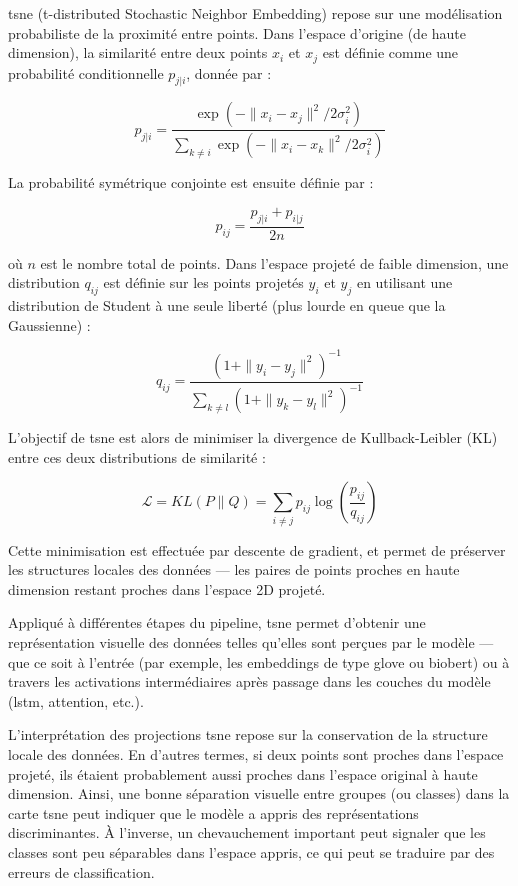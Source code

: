 \documentclass[12pt]{report}
\begin{document}
\gls{tsne} (t-distributed Stochastic Neighbor Embedding) repose sur une modélisation probabiliste de la proximité entre points. Dans l’espace d’origine (de haute dimension), la similarité entre deux points $x_i$ et $x_j$ est définie comme une probabilité conditionnelle $p_{j|i}$, donnée par :

\begin{equation}
p_{j|i} = \frac{\exp(-\|x_i - x_j\|^2 / 2\sigma_i^2)}{\sum_{k \neq i} \exp(-\|x_i - x_k\|^2 / 2\sigma_i^2)}
\end{equation}

La probabilité symétrique conjointe est ensuite définie par :

\begin{equation}
p_{ij} = \frac{p_{j|i} + p_{i|j}}{2n}
\end{equation}

où $n$ est le nombre total de points. Dans l’espace projeté de faible dimension, une distribution $q_{ij}$ est définie sur les points projetés $y_i$ et $y_j$ en utilisant une distribution de Student à une seule liberté (plus lourde en queue que la Gaussienne) :

\begin{equation}
q_{ij} = \frac{(1 + \|y_i - y_j\|^2)^{-1}}{\sum_{k \neq l} (1 + \|y_k - y_l\|^2)^{-1}}
\end{equation}

L’objectif de \gls{tsne} est alors de minimiser la divergence de Kullback-Leibler (KL) entre ces deux distributions de similarité :

\begin{equation}
\mathcal{L} = KL(P \| Q) = \sum_{i \neq j} p_{ij} \log \left( \frac{p_{ij}}{q_{ij}} \right)
\end{equation}

Cette minimisation est effectuée par descente de gradient, et permet de préserver les structures locales des données — les paires de points proches en haute dimension restant proches dans l’espace 2D projeté.

Appliqué à différentes étapes du pipeline, \gls{tsne} permet d’obtenir une représentation visuelle des données telles qu’elles sont perçues par le modèle — que ce soit à l’entrée (par exemple, les embeddings de type \gls{glove} ou \gls{biobert}) ou à travers les activations intermédiaires après passage dans les couches du modèle (\gls{lstm}, attention, etc.).

L’interprétation des projections \gls{tsne} repose sur la conservation de la structure locale des données. En d’autres termes, si deux points sont proches dans l’espace projeté, ils étaient probablement aussi proches dans l’espace original à haute dimension. Ainsi, une bonne séparation visuelle entre groupes (ou classes) dans la carte \gls{tsne} peut indiquer que le modèle a appris des représentations discriminantes. À l’inverse, un chevauchement important peut signaler que les classes sont peu séparables dans l’espace appris, ce qui peut se traduire par des erreurs de classification.
\end{document}
